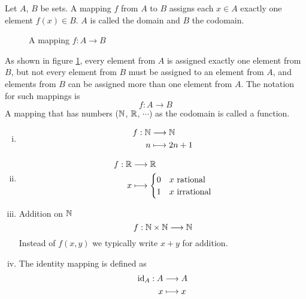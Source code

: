 \documentclass[../../script.tex]{subfiles}
\begin{document}
\begin{defi}
Let $A$, $B$ be sets. A mapping $f$ from $A$ to $B$ assigns each $x \in A$ exactly one element $f(x) \in B$. $A$ is called the domain and $B$ the codomain.

\begin{figure}[ht]
\centering
{}
\caption{A mapping $f: A \rightarrow B$}
\label{fig:mapping}
\end{figure}
As shown in figure \ref{fig:mapping}, every element from $A$ is assigned exactly one element from $B$, but not every element from $B$ must be assigned to an element from $A$, and elements from $B$ can be assigned more than one element from $A$. The notation for such mappings is
\[
	f: A \longrightarrow B
\]
A mapping that has numbers ($\mathbb{N}$, $\mathbb{R}$, $\cdots$) as the codomain is called a function.
\end{defi}

\begin{eg}\leavevmode
\begin{enumerate}[(i)]
	\item 
	\begin{align*}
		f: \mathbb{N} &\longrightarrow \mathbb{N} \\
		n &\longmapsto 2n + 1
	\end{align*}
	\item 
	\begin{align*}
		f: \mathbb{R} &\longrightarrow \mathbb{R} \\
		x &\longmapsto 
		\begin{cases}
			0 & x \text{ rational} \\
			1 & x \text{ irrational}
		\end{cases}
	\end{align*}
	\item Addition on $\mathbb{N}$
	\[
		f: \mathbb{N} \times \mathbb{N} \longrightarrow \mathbb{N}
	\]
	Instead of $f(x, y)$ we typically write $x + y$ for addition.
	\item The identity mapping is defined as
	\begin{align*}
		\text{id}_A: A &\longrightarrow A \\
		x &\longmapsto x
	\end{align*}
\end{enumerate}
\end{eg}
\end{document}
